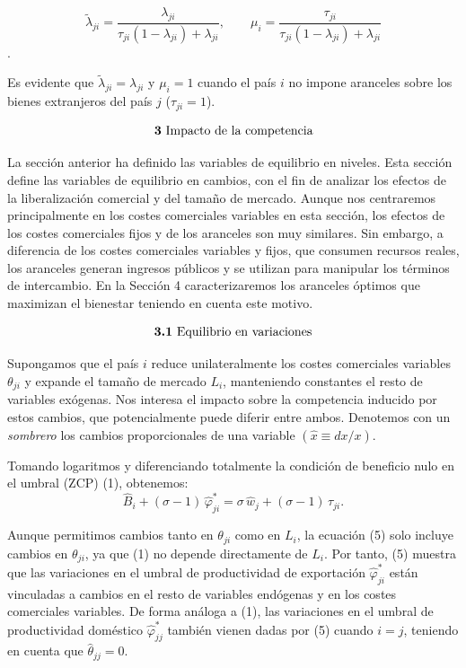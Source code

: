 \documentclass[10pt,a4paper]{article}
\begin{document}
$$\tilde{\lambda}_{ji} = \frac{\lambda_{ji}}{\tau_{ji}(1 - \lambda_{ji}) + \lambda_{ji}}, \qquad \mu_i = \frac{\tau_{ji}}{\tau_{ji}(1 - \lambda_{ji}) + \lambda_{ji}}$$.

Es evidente que $\tilde{\lambda}_{ji} = \lambda_{ji}$ y $\mu_i = 1$ cuando el país $i$ no impone aranceles sobre los bienes extranjeros del país $j$ ($\tau_{ji} = 1$).

$$\text{\textbf{3} Impacto de la competencia}$$

La sección anterior ha definido las variables de equilibrio en niveles. Esta sección define las variables de equilibrio en cambios, con el fin de analizar los efectos de la liberalización comercial y del tamaño de mercado. Aunque nos centraremos principalmente en los costes comerciales variables en esta sección, los efectos de los costes comerciales fijos y de los aranceles son muy similares. Sin embargo, a diferencia de los costes comerciales variables y fijos, que consumen recursos reales, los aranceles generan ingresos públicos y se utilizan para manipular los términos de intercambio. En la Sección 4 caracterizaremos los aranceles óptimos que maximizan el bienestar teniendo en cuenta este motivo.

$$\text{\textbf{3.1} Equilibrio en variaciones}$$

Supongamos que el país $i$ reduce unilateralmente los costes comerciales variables $\theta_{ji}$ y expande el tamaño de mercado $L_i$, manteniendo constantes el resto de variables exógenas. Nos interesa el impacto sobre la competencia inducido por estos cambios, que potencialmente puede diferir entre ambos. Denotemos con un \textit{sombrero} los cambios proporcionales de una variable $(\hat{x} \equiv dx/x)$.

Tomando logaritmos y diferenciando totalmente la condición de beneficio nulo en el umbral (ZCP) (1), obtenemos:
$$\hat{B}_i + (\sigma - 1)\,\hat{\varphi}_{ji}^* = \sigma \,\hat{w}_j + (\sigma - 1)\,\hat{\tau}_{ji}. \tag{5}$$

Aunque permitimos cambios tanto en $\theta_{ji}$ como en $L_i$, la ecuación (5) solo incluye cambios en $\theta_{ji}$, ya que (1) no depende directamente de $L_i$. Por tanto, (5) muestra que las variaciones en el umbral de productividad de exportación $\hat{\varphi}_{ji}^*$ están vinculadas a cambios en el resto de variables endógenas y en los costes comerciales variables. De forma análoga a (1), las variaciones en el umbral de productividad doméstico $\hat{\varphi}_{jj}^*$ también vienen dadas por (5) cuando $i = j$, teniendo en cuenta que $\hat{\theta}_{jj} = 0$.
\end{document}

